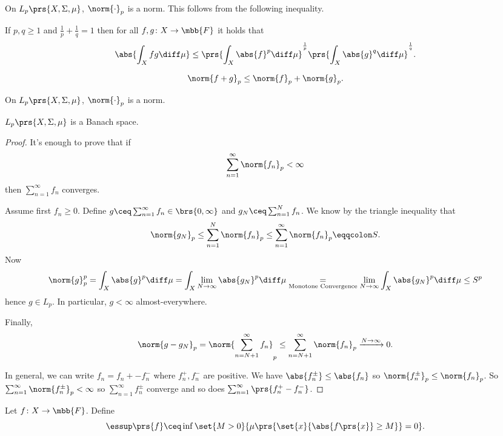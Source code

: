 \documentclass[10pt, twoside]{book}
\begin{document}
On $L_p \prs{X, \Sigma, \mu}$, $\norm{\cdot}_p$ is a norm. This follows from the following inequality.

\begin{theorem}
If $p,q \geq 1$ and $\frac{1}{p} + \frac{1}{q} = 1$ then for all $f,g \colon X \to \mbb{F}$ it holds that
\[\abs{\int_X fg \diff \mu} \leq \prs{\int_X \abs{f}^p \diff \mu}^{\frac{1}{p}} \prs{\int_X \abs{g}^q \diff \mu}^{\frac{1}{q}} \text{.}\]
\end{theorem}

\begin{corollary}
\[\norm{f+g}_p \leq \norm{f}_p + \norm{g}_p \text{.}\]
\end{corollary}

\begin{corollary}
On $L_p\prs{X, \Sigma, \mu}$, $\norm{\cdot}_p$ is a norm.
\end{corollary}

\begin{theorem}
$L_p\prs{X, \Sigma, \mu}$ is a Banach space.
\end{theorem}

\begin{proof}
It's enough to prove that if
\[\sum_{n=1}^{\infty} \norm{f_n}_p < \infty\]
then
$\sum_{n=1}^{\infty} f_n$ converges.

Assume first $f_n \geq 0$. Define $g \ceq \sum_{n=1}^{\infty} f_n \in \brs{0,\infty}$ and $g_N \ceq \sum_{n=1}^N f_n$.
We know by the triangle inequality that
\[\norm{g_N}_p \leq \sum_{n=1}^N \norm{f_n}_p \leq \sum_{n=1}^{\infty} \norm{f_n}_p \eqqcolon S \text{.}\]
Now
\[\norm{g}_p^p = \int_X \abs{g}^p \diff \mu = \int_X \lim_{N \to \infty} \abs{g_N}^p \diff \mu \underset{\text{Monotone Convergence}}{=} \lim_{N \to \infty} \int_X \abs{g_N}^p \diff \mu \leq S^p\]
hence $g \in L_p$.
In particular, $g < \infty$ almost-everywhere.

Finally,
\[\norm{g - g_N}_p = \norm{\sum_{n = N+1}^\infty f_n}_p \leq \sum_{n = N + 1}^\infty \norm{f_n}_p \xrightarrow{N \to \infty} 0 \text{.}\]

In general, we can write $f_n = f_n+ - f_n^{-}$ where $f_n^+, f_n^-$ are positive. We have $\abs{f_n^\pm} \leq \abs{f_n}$ so $\norm{f_n^\pm}_p \leq \norm{f_n}_p$.
So $\sum_{n=1}^{\infty} \norm{f_n^\pm}_p < \infty$ so $\sum_{n=1}^{\infty} f_n^\pm$ converge and so does $\sum_{n=1}^{\infty} \prs{f_n^+ - f_n^{-}}$.
\end{proof}

\begin{definition}
Let $f \colon X \to \mbb{F}$.
Define
\[\essup\prs{f} \ceq \inf \set{M > 0}{\mu\prs{\set{x}{\abs{f\prs{x}} \geq M}} = 0} \text{.}\]
\end{definition}
\end{document}
